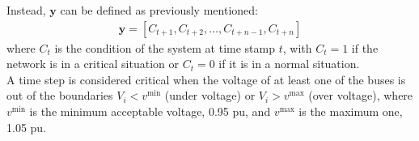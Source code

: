 \noindent Instead, $\textbf{y}$ can be defined as previously mentioned: 
\begin{equation}
    \begin{aligned}
        \textbf{y} = [C_{t+1},C_{t+2}, \dots, C_{t+n-1},C_{t+n}]
    \end{aligned}
\end{equation}
\noindent where $C_t$ is the condition of the system at time stamp $t$, with $C_t=1$ if the network is in a critical situation or $C_t=0$ if it is in a normal situation. \\

A time step is considered critical when the voltage of at least one of the buses is out of the boundaries $V_i < v^{\text{min}}$ (under voltage) or $V_i > v^{\text{max}}$ (over voltage), where $v^{\text{min}}$ is the minimum acceptable voltage, 0.95 \gls{pu}, and $v^{\text{max}}$ is the maximum one, 1.05 \gls{pu}.







